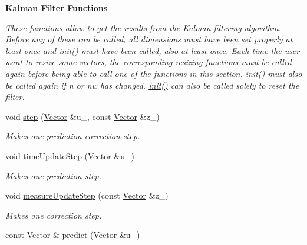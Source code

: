 \begin{Indent}\textbf{ Kalman Filter Functions}\par
{\em These functions allow to get the results from the Kalman filtering algorithm. Before any of these can be called, all dimensions must have been set properly at least once and {\ttfamily \mbox{\hyperlink{classKalman_1_1EKFilter_a80d5dc8f46e8f5d4ec3a6b1e804fdc9f}{init()}}} must have been called, also at least once. Each time the user want to resize some vectors, the corresponding resizing functions must be called again before being able to call one of the functions in this section. {\ttfamily \mbox{\hyperlink{classKalman_1_1EKFilter_a80d5dc8f46e8f5d4ec3a6b1e804fdc9f}{init()}}} must also be called again if {\itshape n} or {\itshape nw} has changed. {\ttfamily \mbox{\hyperlink{classKalman_1_1EKFilter_a80d5dc8f46e8f5d4ec3a6b1e804fdc9f}{init()}}} can also be called solely to reset the filter. }\begin{DoxyCompactItemize}
\item 
void \mbox{\hyperlink{classKalman_1_1EKFilter_ac481300c7de95accb6d3705ee93cb35f}{step}} (\mbox{\hyperlink{classKalman_1_1EKFilter_af773d1217ecb01925b857d49b32bc636}{Vector}} \&u\+\_\+, const \mbox{\hyperlink{classKalman_1_1EKFilter_af773d1217ecb01925b857d49b32bc636}{Vector}} \&z\+\_\+)
\begin{DoxyCompactList}\small\item\em Makes one prediction-\/correction step. \end{DoxyCompactList}\item 
void \mbox{\hyperlink{classKalman_1_1EKFilter_a715d9c634db18e24579673f426750e36}{time\+Update\+Step}} (\mbox{\hyperlink{classKalman_1_1EKFilter_af773d1217ecb01925b857d49b32bc636}{Vector}} \&u\+\_\+)
\begin{DoxyCompactList}\small\item\em Makes one prediction step. \end{DoxyCompactList}\item 
void \mbox{\hyperlink{classKalman_1_1EKFilter_a01c2889b2229cb815f9e4b10b0402110}{measure\+Update\+Step}} (const \mbox{\hyperlink{classKalman_1_1EKFilter_af773d1217ecb01925b857d49b32bc636}{Vector}} \&z\+\_\+)
\begin{DoxyCompactList}\small\item\em Makes one correction step. \end{DoxyCompactList}\item 
const \mbox{\hyperlink{classKalman_1_1EKFilter_af773d1217ecb01925b857d49b32bc636}{Vector}} \& \mbox{\hyperlink{classKalman_1_1EKFilter_a5f50329514f21971663ae6d4a26a1bb6}{predict}} (\mbox{\hyperlink{classKalman_1_1EKFilter_af773d1217ecb01925b857d49b32bc636}{Vector}} \&u\+\_\+)

\end{DoxyCompactItemize}
\end{Indent}
